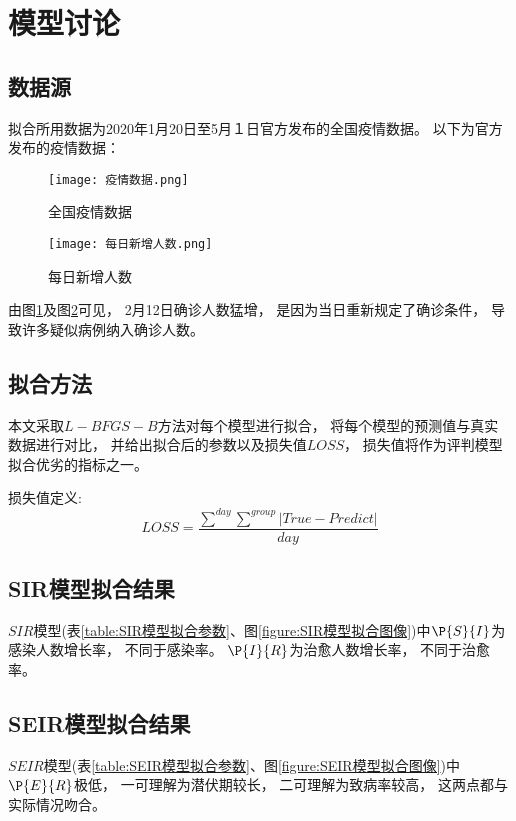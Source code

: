 \section{模型讨论}
\subsection{数据源}
\par 拟合所用数据为2020年1月20日至5月１日官方发布的全国疫情数据。
以下为官方发布的疫情数据：
\begin{figure}[H]
    \centering
    \texttt{[image: 疫情数据.png]}
    \caption{全国疫情数据\label{figure:全国疫情数据}}
\end{figure}
\begin{figure}[H]
    \centering
    \texttt{[image: 每日新增人数.png]}
    \caption{每日新增人数\label{figure:每日新增人数}}
\end{figure}
\par
由图\ref{figure:全国疫情数据}及图\ref{figure:每日新增人数}可见，
2月12日确诊人数猛增，
是因为当日重新规定了确诊条件，
导致许多疑似病例纳入确诊人数。
\subsection{拟合方法}
\par 本文采取$L-BFGS-B$方法对每个模型进行拟合，
将每个模型的预测值与真实数据进行对比，
并给出拟合后的参数以及损失值$LOSS$，
损失值将作为评判模型拟合优劣的指标之一。
\par 损失值定义:
\begin{equation}
    LOSS = \frac{\sum\limits^{day}\sum\limits^{group}
        \left|True-Predict\right|}{day}
\end{equation}
\subsection{SIR模型拟合结果}
\par $SIR$模型(表\ref{table:SIR模型拟合参数}、图\ref{figure:SIR模型拟合图像})中$\P{S}{I}$为感染人数增长率，
不同于感染率。
$\P{I}{R}$为治愈人数增长率，
不同于治愈率。
\subsection{SEIR模型拟合结果}
\par $SEIR$模型(表\ref{table:SEIR模型拟合参数}、图\ref{figure:SEIR模型拟合图像})中$\P{E}{R}$极低，
一可理解为潜伏期较长，
二可理解为致病率较高，
这两点都与实际情况吻合。
